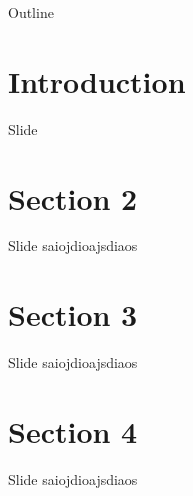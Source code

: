 \begin{frame}
\titlepage
\end{frame}

\begin{frame}{Outline}
\tableofcontents
\end{frame}

\section{Introduction} %
\begin{frame}{Slide}
\begin{center}
\scalebox{0.56}{
    \begin{tikzpicture}[auto,swap]
    
    \end{tikzpicture}
}
\end{center}

\end{frame}

\section{Section 2} %
\begin{frame}{Slide}
saiojdioajsdiaos
\end{frame}

\section{Section 3} %
\begin{frame}{Slide}
saiojdioajsdiaos
\end{frame}

\section{Section 4} %
\begin{frame}{Slide}
saiojdioajsdiaos
\end{frame}
